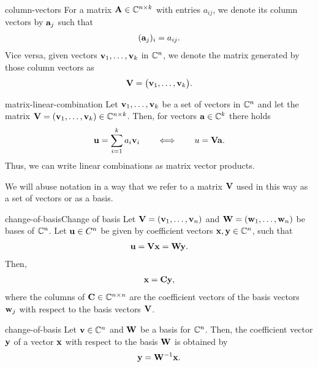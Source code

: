 \begin{Notation}{column-vectors}
  For a matrix $\mathbf A\in \mathbb C^{n\times k}$ with entries $a_{ij}$, we denote its column vectors by $\mathbf a_j$ such that
  \begin{gather}
      (\mathbf a_j)_i = a_{ij}.
  \end{gather}
  Vice versa, given vectors $\mathbf v_1,\dots,\mathbf v_k$ in $\mathbb C^n$, we denote the matrix generated by those column vectors as
  \begin{gather}
      \mathbf V = \bigl( \mathbf v_1,\dots,\mathbf v_k\bigr).
  \end{gather}
\end{Notation}

\begin{Notation}{matrix-linear-combination}
  Let $\mathbf v_1,\dots,\mathbf v_k$ be a set of vectors in $\mathbb C^n$ and let the matrix $\mathbf V=(\mathbf v_1,\dots,\mathbf v_k) \in \mathbb C^{n\times k}$. Then, for vectors $\mathbf a\in\mathbb C^k$ there holds
  \begin{gather}
      \mathbf u = \sum_{i=1}^k a_i \mathbf v_i
      \qquad \Longleftrightarrow \qquad
      u = \mathbf V \mathbf a.
  \end{gather}
  Thus, we can write linear combinations as matrix vector products.

  We will abuse notation in a way that we refer to a matrix $\mathbf V$
  used in this way as a set of vectors or as a basis.
\end{Notation}

\begin{Lemma*}{change-of-basis}{Change of basis}
  Let $\mathbf V = (\mathbf v_1,\dots, \mathbf v_n)$ and $\mathbf W = (\mathbf w_1,\dots, \mathbf w_n)$ be
  bases of $\mathbb C^n$. Let $\mathbf u\in C^n$ be given by coefficient vectors
  $\mathbf x,\mathbf y\in \mathbb C^n$, such that
  \begin{gather}
    \mathbf u = \mathbf V\mathbf x = \mathbf W\mathbf y.
  \end{gather}
  Then,
  \begin{gather}
    \mathbf x = \mathbf C \mathbf y,
  \end{gather}
  where the columns of $\mathbf C\in \mathbb C^{n\times n}$ are the coefficient
  vectors of the basis vectors $\mathbf w_j$ with respect to the basis
  vectors $\mathbf V$.
\end{Lemma*}

\begin{Corollary}{change-of-basis}
  Let $\mathbf v\in \mathbb C^n$ and $\mathbf W$ be a basis for $\mathbb C^n$. Then, the
  coefficient vector $\mathbf y$ of a vector $\mathbf x$ with respect to the
  basis $\mathbf W$ is obtained by
  \begin{gather}
    \mathbf y = \mathbf W^{-1} \mathbf x.
  \end{gather}
\end{Corollary}

